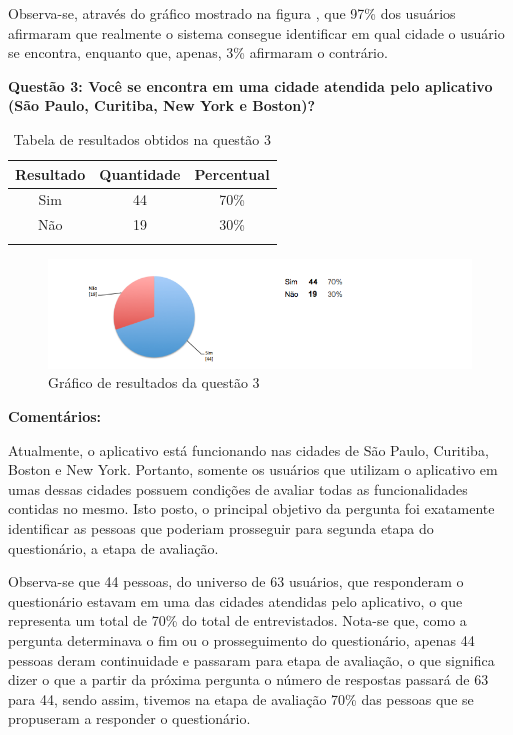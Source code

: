 Observa-se, através do gráfico mostrado na figura , que 97\% dos usuários afirmaram que realmente o sistema consegue identificar em qual cidade o usuário se encontra, enquanto que, apenas, 3\% afirmaram o contrário. 

\textbf{Questão 3:  Você se encontra em uma cidade atendida pelo aplicativo (São Paulo, Curitiba, New York e Boston)?}

\begin{center}
\begin{longtable}{c|c|c}
\hline
    \multicolumn{1}{c}{\textbf{Resultado}} & \multicolumn{1}{c}{\textbf{Quantidade}} & \multicolumn{1}{c}{\textbf{Percentual}} \\
\hline
    Sim & 44 &  70\%\\
    \hline
    Não & 19 & 30\%\\
    \hline
\caption{Tabela de resultados obtidos na questão 3}
\end{longtable}
\end{center}


\begin{figure}[h]
\begin{center}
  \includegraphics[width=16cm]{images/graficos/questao3.png}
  \caption{Gráfico de resultados da questão 3}
  \label{fig:questao3}
\end{center}
\end{figure}

\textbf{Comentários:}

Atualmente, o aplicativo está funcionando nas cidades de São Paulo, Curitiba, Boston e New York. Portanto, somente os usuários que utilizam o aplicativo em umas dessas cidades possuem condições de avaliar todas as funcionalidades contidas no mesmo. Isto posto, o principal objetivo da pergunta foi exatamente identificar as pessoas que  poderiam prosseguir para segunda etapa do questionário, a etapa de avaliação. 
	
Observa-se que 44 pessoas, do universo de 63 usuários, que responderam o questionário estavam em uma das cidades atendidas pelo aplicativo, o que representa um total de 70\% do total de entrevistados. Nota-se que, como a pergunta determinava o fim ou o prosseguimento do questionário, apenas 44 pessoas deram continuidade e passaram para etapa de avaliação, o que significa dizer o que a partir da próxima pergunta o número de respostas passará de 63 para 44, sendo assim, tivemos na etapa de avaliação 70\% das pessoas que se propuseram a responder o questionário.\newline

